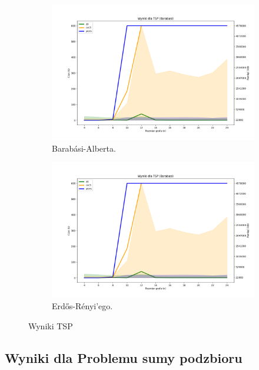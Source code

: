 \begin{figure}[htbp]
	\centering
	\begin{subfigure}[b]{0.45\textwidth}
		\includegraphics[width=\textwidth]{./figures/7-barabasi-plot.png}
		\caption{Barabási-Alberta.}
		\label{fig:7-barabasi-plot}
	\end{subfigure}
	\begin{subfigure}[b]{0.45\textwidth}
		\includegraphics[width=\textwidth]{./figures/7-barabasi-plot.png}
		\caption{Erdős-Rényi'ego.}
		\label{fig:7-barabasi-plot}
	\end{subfigure}
	\caption{Wyniki TSP}
	\label{fig:7}
\end{figure}

\subsection{Wyniki dla Problemu sumy podzbioru}

